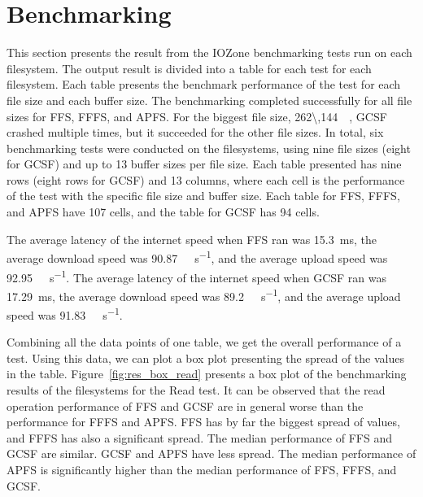 \section{Benchmarking}
\label{sec:res_bench}
This section presents the result from the IOZone benchmarking tests run on each filesystem. The output result is divided into a table for each test for each filesystem. Each table presents the benchmark performance of the test for each file size and each buffer size. The benchmarking completed successfully for all file sizes for \gls{FFS}, \gls{FFFS}, and \gls{APFS}. For the biggest file size, \SI{262\,144}{\kilo\byte}, \gls{GCSF} crashed multiple times, but it succeeded for the other file sizes. In total, six benchmarking tests were conducted on the filesystems, using nine file sizes (eight for \gls{GCSF}) and up to 13 buffer sizes per file size. Each table presented has nine rows (eight rows for \gls{GCSF}) and 13 columns, where each cell is the performance of the test with the specific file size and buffer size. Each table for \gls{FFS}, \gls{FFFS}, and \gls{APFS} have 107 cells, and the table for \gls{GCSF} has 94 cells.

The average latency of the internet speed when \gls{FFS} ran was \SI{15.3}{\milli\second}, the average download speed was \SI[per-mode = symbol]{90.87}{\mega\bit\per\second}, and the average upload speed was \SI[per-mode = symbol]{92.95}{\mega\bit\per\second}. The average latency of the internet speed when \gls{GCSF} ran was \SI{17.29}{\milli\second}, the average download speed was \SI[per-mode = symbol]{89.2}{\mega\bit\per\second}, and the average upload speed was \SI[per-mode = symbol]{91.83}{\mega\bit\per\second}.

Combining all the data points of one table, we get the overall performance of a test. Using this data, we can plot a box plot presenting the spread of the values in the table. Figure~\ref{fig:res_box_read} presents a box plot of the benchmarking results of the filesystems for the Read test. It can be observed that the read operation performance of \gls{FFS} and \gls{GCSF} are in general worse than the performance for \gls{FFFS} and \gls{APFS}. \gls{FFS} has by far the biggest spread of values, and \gls{FFFS} has also a significant spread. The median performance of \gls{FFS} and \gls{GCSF} are similar. \gls{GCSF} and \gls{APFS} have less spread. The median performance of \gls{APFS} is significantly higher than the median performance of \gls{FFS}, \gls{FFFS}, and \gls{GCSF}. 

